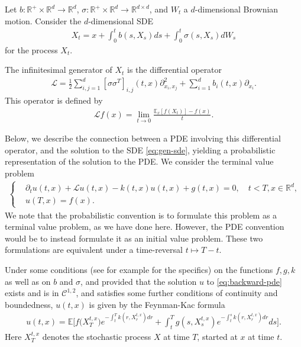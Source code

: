 \documentclass{article}  %
\begin{document}
Let $b:\mathbb{R}^+ \times \mathbb{R}^d \rightarrow \mathbb{R}^d$, $\sigma:\mathbb{R}^+ \times \mathbb{R}^d \rightarrow \mathbb{R}^{d \times d}$, and $W_t$ a $d$-dimensional Brownian motion. Consider the $d$-dimensional SDE
%
\begin{align}
    \label{eq:gen-sde}
X_t = x + \int_0^t b(s,X_s) ds + \int_0^t \sigma(s,X_s)dW_s
\end{align}
%
for the process $X_t$. 

The infinitesimal generator of $X_t$ is the differential operator 
%
\begin{align}
    \label{eq:generator-operator}
    \mathcal{L} = \frac{1}{2} \sum_{i,j=1}^d [\sigma \sigma^T]_{i,j}(t,x) \partial_{x_i,x_j}^2 + \sum_{i=1}^d b_i(t,x) \partial_{x_i}.
\end{align}
%
This operator is defined by
%
\begin{align} 
    \mathcal{L}f(x) = \lim_{t\rightarrow 0} \frac{\mathbb{E}_x[f(X_t)]-f(x)}{t}.
\end{align}
%

Below, we describe the connection between a PDE involving this differential operator, and the solution to the SDE \autoref{eq:gen-sde}, yielding a probabilistic representation of the solution to the PDE. We consider the terminal value problem
%
\begin{align}
    \label{eq:backward-pde}
    \begin{cases}
    &\partial_t u(t,x) + \mathcal{L}u(t,x) - k(t,x)u(t,x) + g(t,x) = 0, \quad t<T,x \in \mathbb{R}^d, \\
    &u(T,x) = f(x).
    \end{cases}
\end{align}
%
We note that the probabilistic convention is to formulate this problem as a terminal value problem, as we have done here. However, the PDE convention would be to instead formulate it as an initial value problem. These two formulations are equivalent under a time-reversal $t \mapsto T-t$. 

Under some conditions (see for example \cite{gobet2016monte} for the specifics) on the functions $f, g, k$ as well as on $b$ and $\sigma$, and provided that the solution $u$ to \autoref{eq:backward-pde} exists and is in $\mathcal{C}^{1,2}$, and satisfies some further conditions of continuity and boundedness, $u(t,x)$ is given by the Feynman-Kac formula
%
\begin{align}
    \label{eq:linear-fc} 
    u(t,x) = \mathbb{E}\bigg[ f\big( X_T^{t,x} \big) e^{-\int_t^T k(r,X_r^{t,x})dr} + \int_t^T g(s,X_s^{t,x}) e^{-\int_t^s k(r,X_r^{t,x})dr}ds\bigg].
\end{align} 
%
Here $X_T^{t,x}$ denotes the stochastic process $X$ at time $T$, started at $x$ at time $t$.
\end{document}
